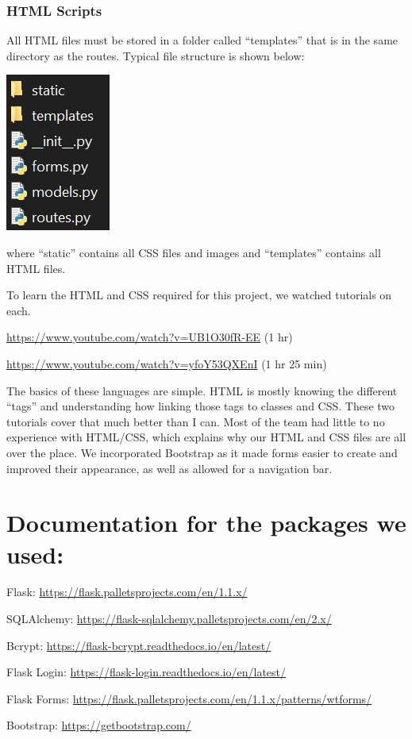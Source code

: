 \documentclass[]{book}
\begin{document}
\hypertarget{html-scripts}{%
\subsubsection{HTML Scripts}\label{html-scripts}}

All HTML files must be stored in a folder called ``templates'' that is in the same directory as the routes. Typical file structure is shown below:

\includegraphics{images/file_structure.jpg}

where ``static'' contains all CSS files and images and ``templates'' contains all HTML files.

To learn the HTML and CSS required for this project, we watched tutorials on each.

\url{https://www.youtube.com/watch?v=UB1O30fR-EE} (1 hr)

\url{https://www.youtube.com/watch?v=yfoY53QXEnI} (1 hr 25 min)

The basics of these languages are simple. HTML is mostly knowing the different ``tags'' and understanding how linking those tags to classes and CSS. These two tutorials cover that much better than I can. Most of the team had little to no experience with HTML/CSS, which explains why our HTML and CSS files are all over the place. We incorporated Bootstrap as it made forms easier to create and improved their appearance, as well as allowed for a navigation bar.

\hypertarget{documentation-for-the-packages-we-used}{%
\section{Documentation for the packages we used:}\label{documentation-for-the-packages-we-used}}

Flask: \url{https://flask.palletsprojects.com/en/1.1.x/}

SQLAlchemy: \url{https://flask-sqlalchemy.palletsprojects.com/en/2.x/}

Bcrypt: \url{https://flask-bcrypt.readthedocs.io/en/latest/}

Flask Login: \url{https://flask-login.readthedocs.io/en/latest/}

Flask Forms: \url{https://flask.palletsprojects.com/en/1.1.x/patterns/wtforms/}

Bootstrap: \url{https://getbootstrap.com/}
\end{document}
